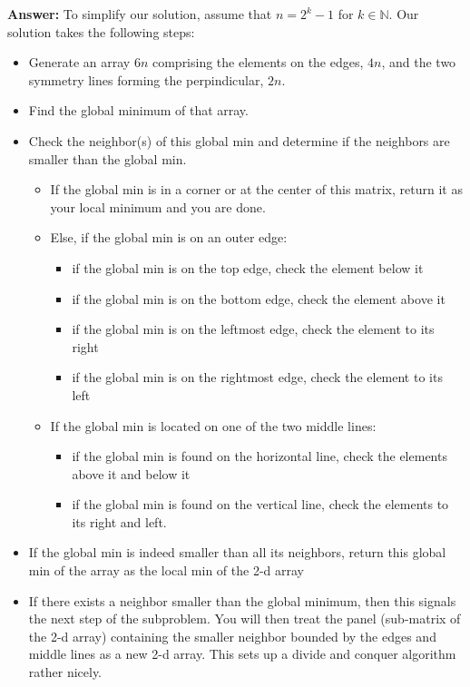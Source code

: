 \documentclass[11pt, oneside]{article}   	%
\theoremstyle{definition}
\theoremstyle{remark}
\begin{document}
\begin{enumerate}
   \textbf{Answer: } To simplify our solution, assume  that $n = 2^k -1$ for $k \in \mathbb{N}$. Our solution takes the following steps:
   \begin{itemize}
   \item Generate an array $6n$ comprising the elements on the edges, $4n$, and the two symmetry lines forming the perpindicular, $2n$.
   \item Find the global minimum of that array.
   \item Check the neighbor(s) of this global min and determine if the neighbors are smaller than the global min. 
   \begin{itemize}
   \item If the global min is in a corner or at the center of this matrix, return it as your local minimum and you are done.
   \item Else, if the global min is on an outer edge:
   \begin{itemize}
   \item if the global min is on the top edge, check the element below it
   \item if the global min is on the bottom edge, check the element above it
   \item if the global min is on the leftmost edge, check the element to its right
   \item if the global min is on the rightmost edge, check the element to its left
   \end{itemize}
   \item If the global min is located on one of the two middle lines:
   \begin{itemize}
   \item if the global min is found on the horizontal line, check the elements above it and below it
   \item if the global min is found on the vertical line, check the elements to its right and left.
   \end{itemize}
   \end{itemize}
   \item If the global min is indeed smaller than all its neighbors, return this global min of the array as the local min of the 2-d array
   \item If there exists a neighbor smaller than the global minimum, then this signals the next step of the subproblem. You will then treat the panel (sub-matrix of the 2-d array) containing the smaller neighbor bounded by the edges and middle lines as a new 2-d array. This sets up a divide and conquer algorithm rather nicely.   

\end{itemize}
\end{enumerate}
\end{document}
